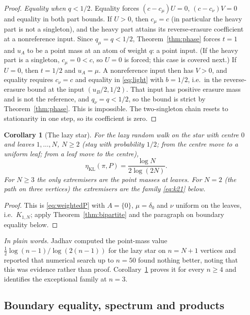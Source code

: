 \documentclass[11pt,a4paper]{article}
\numberwithin{equation}{section}
\newtheorem{corollary}[theorem]{Corollary}
\theoremstyle{definition}
\theoremstyle{remark}
\newcommand{\etaKL}{\eta_{\mathrm{KL}}}
\newcommand{\plain}[1]{\par\smallskip\noindent\textit{In plain words.} #1\par\smallskip}
\begin{document}
\begin{proof}
\emph{Equality when \(q<1/2\).} Equality forces \((c-c_\mu)U=0\),
\((c-c_\nu)V=0\) and equality in both part bounds.
If \(U>0\), then \(c_\mu=c\) (in particular the heavy part is not a
singleton), and the heavy part attains its reverse-erasure coefficient at a
nonreference input. Since \(q_\mu=q<1/2\), Theorem~\ref{thm:phase} forces
\(t=1\) and \(u_A\) to be a point mass at an atom of weight \(q\): a point
input. (If the heavy part is a singleton, \(c_\mu=0<c\), so \(U=0\) is
forced; this case is covered next.)
If \(U=0\), then \(t=1/2\) and \(u_A=\mu\). A nonreference input then has
\(V>0\), and equality requires \(c_\nu=c\) and equality in \eqref{eq:light}
with \(b=1/2\), i.e.\ in the reverse-erasure bound at the input
\((u_B/2,1/2)\). That input has positive erasure mass and is not the
reference, and \(q_\nu=q<1/2\), so the bound is strict by
Theorem~\ref{thm:phase}. This is impossible.
The two-singleton chain resets to stationarity in one step, so its
coefficient is zero.
\end{proof}

\begin{corollary}[The lazy star]\label{cor:star}
For the lazy random walk on the star with centre \(0\) and leaves
\(1,\ldots,N\), \(N\ge2\) (stay with probability \(1/2\); from the centre
move to a uniform leaf; from a leaf move to the centre),
\[
\etaKL(\pi,P)=\frac{\log N}{2\log(2N)} .
\]
For \(N\ge3\) the only extremisers are the point masses at leaves. For
\(N=2\) (the path on three vertices) the extremisers are the family
\eqref{eq:k21} below.
\end{corollary}
\begin{proof}
This is \eqref{eq:weightedP} with \(A=\{0\}\), \(\mu=\delta_0\) and
\(\nu\) uniform on the leaves, i.e.\ \(K_{1,N}\); apply
Theorem~\ref{thm:bipartite} and the paragraph on boundary equality below.
\end{proof}
\plain{Jadhav \cite[Proposition~9.5 and Remark~9.6]{jadhav} computed the
point-mass value \(\tfrac12\log(n-1)/\log(2(n-1))\) for the lazy star on
\(n=N+1\) vertices and reported that numerical search up to \(n=50\) found
nothing better, noting that this was evidence rather than proof.
Corollary~\ref{cor:star} proves it for every \(n\ge4\) and identifies the
exceptional family at \(n=3\).}

\subsection*{Boundary equality, spectrum and products}
\end{document}
